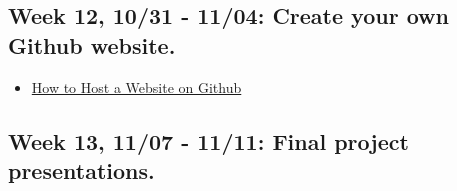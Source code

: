 \documentclass[11pt,]{article}
\providecommand{\tightlist}{%
  \setlength{\itemsep}{0pt}\setlength{\parskip}{0pt}}
\begin{document}
\hypertarget{week-12-1031---1104-create-your-own-github-website.}{%
\subsection{Week 12, 10/31 - 11/04: Create your own Github
website.}\label{week-12-1031---1104-create-your-own-github-website.}}

\begin{itemize}
\tightlist
\item
  \href{https://marcyshieh.github.io/posts/github-website-tutorial/}{How
  to Host a Website on Github}
\end{itemize}

\hypertarget{week-13-1107---1111-final-project-presentations.}{%
\subsection{Week 13, 11/07 - 11/11: Final project
presentations.}\label{week-13-1107---1111-final-project-presentations.}}
\end{document}
